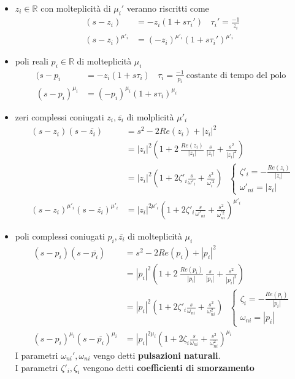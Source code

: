 \documentclass{article}
\theoremstyle{definition}
\newcommand{\R}{\mathbb{R}}
\begin{document}
 \begin{itemize}
\item $z_i \in \R$ con molteplicità di $\mu_i'$ veranno riscritti come 
\begin{align*}
	(s-z_i)&=-z_i (1+s\tau_i') \ \ \ \ \tau_i'=\frac{-1}{z_i} \\
		(s-z_i)^{\mu'_i}&=(-z_i)^{\mu'_i} (1+s\tau_i')^{\mu'_i} 
\end{align*}
\item poli reali  $p_i \in \R$ di molteplicità $\mu_i$
\begin{align*}
	(s-p_i&=-z_i (1+s\tau_i) \ \ \ \ \tau_i=\frac{-1}{p_i} \ \text{costante di tempo del polo } \\
	(s-p_i)^{\mu_i}&=(-p_i)^{\mu_i} (1+s\tau_i)^{\mu_i} 
\end{align*}
\item zeri complessi coniugati $z_i ,\overline{z_i}$ di molplicità $\mu'_i$
 \begin{align*}
 	(s-z_i)(s-\overline{z_i})&=s^2 - 2 Re(z_i)+|z_i|^2\\
 	&=|z_i|^2\left(1+2 \ \frac{Re(z_i)}{|z_i|} \ \frac{s}{|z_i|}+\frac{s^2}{|z_i|^2}\right) \\
 	&=|z_i|^2\left(1+2\zeta'_i \frac{s}{\omega'_i}+\frac{s^2}{\omega^{'2}_i} \right) \ \ \  
 	\begin{cases}
 	\zeta'_i=-\frac{Re(z_i)}{|z_i|} \\
 	\omega'_{ni}=|z_i|
 	\end{cases}\\ 
 	(s-z_i)^{\mu'_i}(s-\overline{z_i})^{\mu'_i}&=|z_i|^{2\mu'_i}\left(1+2\zeta'_i \frac{s}{\omega'_{ni}}+\frac{s^2}{\omega^{'2}_{ni} }\right)^{\mu'_{i}}
\end{align*}
\item poli complessi coniugati $p_i ,\overline{z_i}$ di molteplicità $\mu_i$
\begin{align*}
	(s-p_i)(s-\overline{p_i})&=s^2 - 2 Re(p_i)+|p_i|^2\\
	&=|p_i|^2\left(1+2 \ \frac{Re(p_i)}{|p_i|} \ \frac{s}{|p_i|}+\frac{s^2}{|p_i|^2}\right) \\
	&=|p_i|^2\left(1+2\zeta'_i \frac{s}{\omega_{ni}}+\frac{s^2}{\omega^{2}_{ni}} \right) \ \ \  
	\begin{cases}
		\zeta_i=-\frac{Re(p_i)}{|p_i|} \\
		\omega_{ni}=|p_i|
	\end{cases}\\ 
	(s-p_i)^{\mu_i}(s-\overline{p_i})^{\mu_i}&=|p_i|^{2\mu_i}\left(1+2\zeta_i \frac{s}{\omega_{ni}}+\frac{s^2}{\omega^{2}_{ni}} \right) ^{\mu_i}
\end{align*}
I parametri $\omega_{ni}',\omega_{ni}$ vengo detti \textbf{pulsazioni naturali}.\\
I parametri $\zeta'_i , \zeta_i$ vengono detti \textbf{coefficienti di smorzamento }
\end{itemize}
\end{document}
